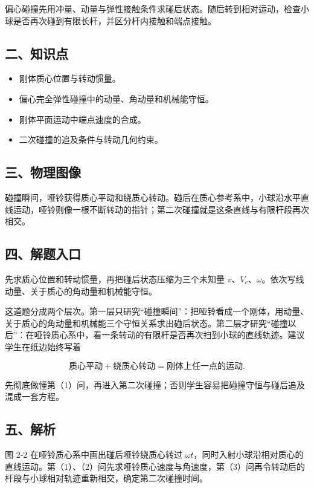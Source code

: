 \documentclass[12pt,a4paper,UTF8]{ctexart}
\newcommand{\tightlist}{\setlength{\itemsep}{0pt}\setlength{\parskip}{0pt}}
\begin{document}
偏心碰撞先用冲量、动量与弹性接触条件求碰后状态。随后转到相对运动，检查小球是否再次碰到有限长杆，并区分杆内接触和端点接触。

\subsection{二、知识点}\label{ux4e8cux77e5ux8bc6ux70b9-1}

\begin{itemize}
\tightlist
\item
  刚体质心位置与转动惯量。
\item
  偏心完全弹性碰撞中的动量、角动量和机械能守恒。
\item
  刚体平面运动中端点速度的合成。
\item
  二次碰撞的追及条件与转动几何约束。
\end{itemize}

\subsection{三、物理图像}\label{ux4e09ux7269ux7406ux56feux50cf-1}

碰撞瞬间，哑铃获得质心平动和绕质心转动。碰后在质心参考系中，小球沿水平直线运动，哑铃则像一根不断转动的指针；第二次碰撞就是这条直线与有限杆段再次相交。

\subsection{四、解题入口}\label{ux56dbux89e3ux9898ux5165ux53e3-1}

先求质心位置和转动惯量，再把碰后状态压缩为三个未知量
\(v\)、\(V_c\)、\(\omega\)。依次写线动量、关于质心的角动量和机械能守恒。

这道题分成两个层次。第一层只研究``碰撞瞬间''：把哑铃看成一个刚体，用动量、关于质心的角动量和机械能三个守恒关系求出碰后状态。第二层才研究``碰撞以后''：在哑铃质心系中，看一条转动的有限杆是否再次扫到小球的直线轨迹。建议学生在纸边始终写着

\[\text{质心平动}+\text{绕质心转动}=\text{刚体上任一点的运动}.\]

先彻底做懂第（1）问，再进入第二次碰撞；否则学生容易把碰撞守恒与碰后追及混成一套方程。

\subsection{五、解析}\label{ux4e94ux89e3ux6790-1}

图 2-2 在哑铃质心系中画出碰后哑铃绕质心转过
\(\omega t\)，同时入射小球沿相对质心的直线运动。第（1）、（2）问先求哑铃质心速度与角速度，第（3）问再令转动后的杆段与小球相对轨迹重新相交，确定第二次碰撞时间。
\end{document}
